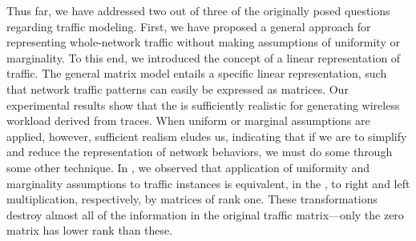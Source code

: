 \documentclass[twocolumn,final]{svjour3}
\begin{document}
Thus far, we have addressed two out of three of the originally posed questions regarding traffic modeling. First, we have proposed a general approach for representing whole-network traffic without making assumptions of uniformity or marginality. To this end, we introduced the concept of a linear representation of traffic. The general matrix model entails a specific linear representation, such that network traffic patterns can easily be expressed as matrices. Our experimental results show that the  is sufficiently realistic for generating wireless workload derived from traces. When uniform or marginal assumptions are applied, however, sufficient realism eludes us, indicating that if we are to simplify and reduce the representation of network behaviors, we must do some through some other technique. In , we observed that application of uniformity and marginality assumptions to traffic instances is equivalent, in the , to right and left multiplication, respectively, by matrices of rank one. These transformations destroy almost all of the information in the original traffic matrix---only the zero matrix has lower rank than these.
\end{document}
